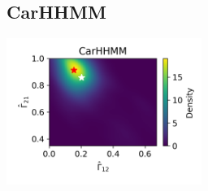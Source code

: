 \documentclass{article}
\begin{document}
        \subsection{CarHHMM}
        \begin{center}
        \includegraphics[width=2.5in]{../Plots/hhmm_V_Gamma_density_-1_row_-1.png}
        

\end{center}
\end{document}
